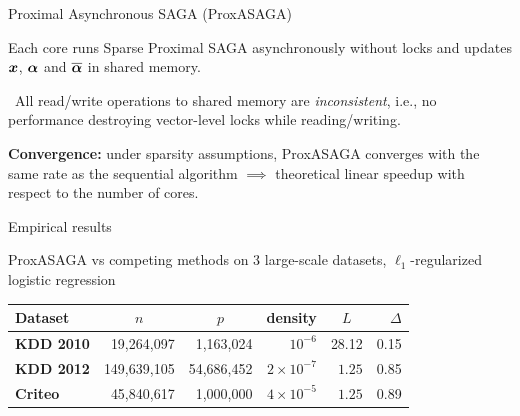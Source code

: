 \documentclass[10pt]{beamer}
\begin{document}
\begin{frame}{Proximal Asynchronous SAGA (ProxASAGA)}

Each core
 runs Sparse Proximal SAGA asynchronously without locks and updates ${\boldsymbol x}$, ${\boldsymbol \alpha}$ and $\overline{{\boldsymbol \alpha}}$ in shared memory.

\vspace{0.5em} \faRandom~All read/write operations to shared memory are \emph{inconsistent}, i.e., no performance destroying vector-level locks while reading/writing.

{\bfseries Convergence:} under sparsity assumptions, ProxASAGA converges with the same rate as the sequential algorithm $\implies$ theoretical linear speedup with respect to the number of cores.
\end{frame}


\begin{frame}{Empirical results}




ProxASAGA vs competing methods on 3 large-scale datasets, $\ell_1$-regularized logistic regression

\vspace{0em}\begingroup
\fontsize{9pt}{10pt}\selectfont
\begin{table}
\centering
\begin{tabular}{lrrrrr}
\toprule
{\bfseries\sffamily Dataset} & \multicolumn{1}{c}{$n$} & \multicolumn{1}{c}{$p$} & {{density}} & \multicolumn{1}{c}{$L$} & $\Delta$\\
\midrule
{\bfseries\sffamily KDD 2010} & \hfill 19,264,097 & \hfill 1,163,024 & \hfill $10^{-6}$ & \hfill 28.12 & 0.15\\
{\bfseries\sffamily KDD 2012} & \hfill 149,639,105 & \hfill 54,686,452 & \hfill $2 \times 10^{-7}$ & \hfill $1.25$ & 0.85\\
{\bfseries\sffamily Criteo} & \hfill 45,840,617 & \hfill 1,000,000 & \hfill $4 \times 10^{-5}$ & \hfill $1.25$ & 0.89\\
\bottomrule
\end{tabular}
\end{table}
\endgroup



\end{frame}
\end{document}
